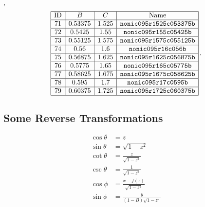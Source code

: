 \documentclass[a4paper,11pt]{scrartcl}
\newcommand{\pstretch}{C}
\newcommand{\ppress}{B}
\begin{document}
\ie,
\begin{align}
  \begin{array}{|c|c|c|c|}
    \hline
    \text{ID} & \ppress & \pstretch & \text{Name}\\\hline
71 & 0.53375 & 1.525 & \texttt{nonic095r1525c053375b} \\\hline
72 & 0.5425 & 1.55 & \texttt{nonic095r155c05425b} \\\hline
73 & 0.55125 & 1.575 & \texttt{nonic095r1575c055125b} \\\hline
74 & 0.56 & 1.6 & \texttt{nonic095r16c056b} \\\hline
75 & 0.56875 & 1.625 & \texttt{nonic095r1625c056875b} \\\hline
76 & 0.5775 & 1.65 & \texttt{nonic095r165c05775b} \\\hline
77 & 0.58625 & 1.675 & \texttt{nonic095r1675c058625b} \\\hline
78 & 0.595 & 1.7 & \texttt{nonic095r17c0595b} \\\hline
79 & 0.60375 & 1.725 & \texttt{nonic095r1725c060375b} \\\hline
  \end{array} \formPeriod
\end{align}




\subsection{Some Reverse Transformations}
\begin{align}
  \cos\theta &= z\\
  \sin\theta &= \sqrt{1-z^{2}}\\
  \cot\theta &= \frac{z}{ \sqrt{1-z^{2}}}\\
  \csc\theta &= \frac{1}{ \sqrt{1-z^{2}}}\\
  \cos\phi  &= \frac{x-f(z)}{\sqrt{1-z^{2}}}\\
  \sin\phi &= \frac{y}{(1-\ppress)\sqrt{1-z^{2}}}\\
\end{align}
\end{document}
